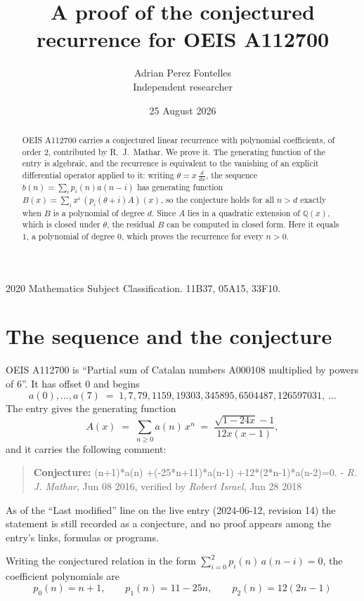 \documentclass[11pt,a4paper]{article}
\title{A proof of the conjectured recurrence for OEIS A112700}
\author{Adrian Perez Fontelles\\ \small Independent researcher}
\date{25 August 2026}
\theoremstyle{plain}
\theoremstyle{definition}
\begin{document}
\maketitle

\begin{abstract}
OEIS A112700 carries a conjectured linear recurrence with polynomial coefficients, of
order 2, contributed by R.~J.~Mathar. We prove it. The generating function of the
entry is algebraic, and the recurrence is equivalent to the vanishing of an explicit
differential operator applied to it: writing $\theta=x\,\frac{d}{dx}$, the sequence
$b(n)=\sum_{i}p_{i}(n)a(n-i)$ has generating function
$B(x)=\sum_{i}x^{i}\,(p_{i}(\theta+i)A)(x)$, so the conjecture holds for all $n>d$ exactly
when $B$ is a polynomial of degree $d$. Since $A$ lies in a quadratic extension of
$\mathbb{Q}(x)$, which is closed under $\theta$, the residual $B$ can be computed in
closed form. Here it equals $1$, a polynomial of degree $0$, which proves
the recurrence for every $n>0$.
\end{abstract}

\noindent\small 2020 Mathematics Subject Classification. 11B37, 05A15, 33F10.\normalsize

\section{The sequence and the conjecture}

OEIS A112700 is ``Partial sum of Catalan numbers A000108 multiplied by powers of 6''. It has offset $0$ and begins
\[
a(0),\dots,a(7)\;=\;1, 7, 79, 1159, 19303, 345895, 6504487, 126597031,\ \dots
\]
The entry gives the generating function
\begin{equation}\label{eq:gf}
A(x)\;=\;\sum_{n\ge 0} a(n)\,x^{n}\;=\;\frac{\sqrt{1 - 24 x} - 1}{12 x \left(x - 1\right)} ,
\end{equation}
and it carries the following comment:
\begin{quote}\small
\textbf{Conjecture:} (n+1)*a(n) +(-25*n+11)*a(n-1) +12*(2*n-1)*a(n-2)=0. - \emph{R. J. Mathar}, Jun 08 2016, verified by \emph{Robert Israel}, Jun 28 2018
\end{quote}
As of the ``Last modified'' line on the live entry (2024-06-12, revision 14) the
statement is still recorded as a conjecture, and no proof appears among the entry's links,
formulas or programs.

Writing the conjectured relation in the form $\sum_{i=0}^{2}p_{i}(n)\,a(n-i)=0$,
the coefficient polynomials are
\[
p_{0}(n)=n + 1,\qquad p_{1}(n)=11 - 25 n,\qquad p_{2}(n)=12 \left(2 n - 1\right)
\]
\end{document}
